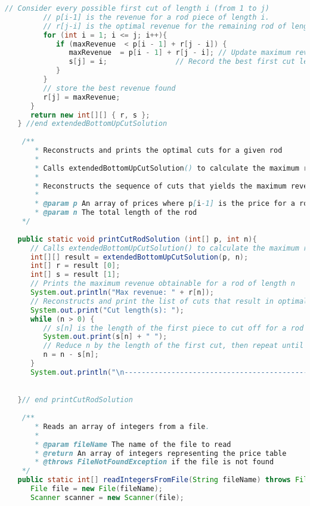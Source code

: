 \documentclass[11pt]{article}
\begin{document}
\begin{lstlisting}[language=Java]
         // Consider every possible first cut of length i (from 1 to j)
         // p[i-1] is the revenue for a rod piece of length i.
         // r[j-i] is the optimal revenue for the remaining rod of length j-i.
         for (int i = 1; i <= j; i++){
            if (maxRevenue  < p[i - 1] + r[j - i]) {
               maxRevenue  = p[i - 1] + r[j - i]; // Update maximum revenue if this cut is better.
               s[j] = i;                // Record the best first cut length for rod length j
            }
         }
         // store the best revenue found
         r[j] = maxRevenue;
      }
      return new int[][] { r, s };
   } //end extendedBottomUpCutSolution
   
    /**
       * Reconstructs and prints the optimal cuts for a given rod
       *
       * Calls extendedBottomUpCutSolution() to calculate the maximum revenue for a rod of length n and the optimal first cut for each rod length
       *
       * Reconstructs the sequence of cuts that yields the maximum revenue
       *
       * @param p An array of prices where p[i-1] is the price for a rod of length i
       * @param n The total length of the rod
    */
    
   public static void printCutRodSolution (int[] p, int n){
      // Calls extendedBottomUpCutSolution() to calculate the maximum revenue for a rod of length n and the optimal first cut for each rod length
      int[][] result = extendedBottomUpCutSolution(p, n);
      int[] r = result [0];
      int[] s = result [1];
      // Prints the maximum revenue obtainable for a rod of length n
      System.out.println("Max revenue: " + r[n]);
      // Reconstructs and print the list of cuts that result in optimal revenue
      System.out.print("Cut length(s): ");
      while (n > 0) {
         // s[n] is the length of the first piece to cut off for a rod of length n
         System.out.print(s[n] + " ");
         // Reduce n by the length of the first cut, then repeat until no length remains
         n = n - s[n];
      }
      System.out.println("\n----------------------------------------------");

   
   }// end printCutRodSolution
 
    /**
       * Reads an array of integers from a file.
       *
       * @param fileName The name of the file to read
       * @return An array of integers representing the price table
       * @throws FileNotFoundException if the file is not found
    */
   public static int[] readIntegersFromFile(String fileName) throws FileNotFoundException {
      File file = new File(fileName);
      Scanner scanner = new Scanner(file);
      

\end{lstlisting}
\end{document}

